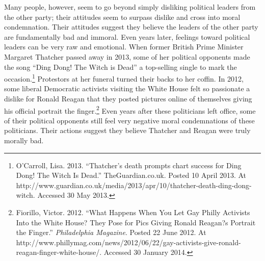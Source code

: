 Many people, however, seem to go beyond simply disliking political leaders from the other party; their attitudes seem to surpass dislike and cross into moral condemnation. Their attitudes suggest they believe the leaders of the other party are fundamentally bad and immoral. Even years later, feelings toward political leaders can be very raw and emotional. When former British Prime Minister Margaret Thatcher passed away in 2013, some of her political opponents made the song ``Ding Dong! The Witch is Dead'' a top-selling single to mark the occasion.\footnote{O'Carroll, Lisa. 2013. ``Thatcher's death prompts chart success for Ding Dong! The Witch Is Dead.'' TheGuardian.co.uk. Posted 10 April 2013. At http://www.guardian.co.uk/media/2013/apr/10/thatcher-death-ding-dong-witch. Accessed 30 May 2013.} Protestors at her funeral turned their backs to her coffin. In 2012, some liberal Democratic activists visiting the White House felt so passionate a dislike for Ronald Reagan that they posted pictures online of themselves giving his official portrait the finger.\footnote{Fiorillo, Victor. 2012. ``What Happens When You Let Gay Philly Activists Into the White House?
They Pose for Pics Giving Ronald Reagan?s Portrait the Finger.'' \emph{Philadelphia Magazine}. Posted 22 June 2012. At http://www.phillymag.com/news/2012/06/22/gay-activists-give-ronald-reagan-finger-white-house/. Accessed 30 January 2014.} Even years after these politicians left office, some of their political opponents still feel very negative moral condemnations of these politicians. Their actions suggest they believe Thatcher and Reagan were truly morally bad.

